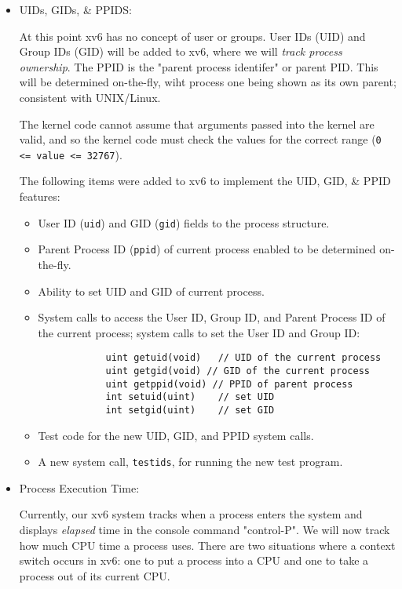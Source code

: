\documentclass[11pt,letterpaper]{report}
\begin{document}
	\begin{itemize}
		
	\item UIDs, GIDs, \& PPIDS:
	
	At this point xv6 has no concept of user or groups. User IDs (UID) and Group IDs (GID) will be added to xv6, where we will \emph{track process ownership}. The PPID is the "parent process identifer" or parent PID. This will be determined on-the-fly, wiht process one being shown as its own parent; consistent with UNIX/Linux.
	
	The kernel code cannot assume that arguments passed into the kernel are valid, and so the kernel code must check the values for the correct range ({\tt 0 <= value <= 32767}).
			
	The following items were added to xv6 to implement the UID, GID, \& PPID features:
			\begin{itemize}
	
			\item User ID ({\tt uid}) and GID ({\tt gid}) fields to the process structure.
	
			\item Parent Process ID ({\tt ppid}) of current process enabled to be determined on-the-fly.
	
			\item Ability to set UID and GID of current process.
	
			\item System calls to access the User ID, Group ID, and Parent Process ID of the current process; system calls to set the User ID and Group ID:
			\begin{verbatim}
			uint getuid(void)	// UID of the current process
			uint getgid(void) // GID of the current process
			uint getppid(void) // PPID of parent process
			int setuid(uint)	// set UID
			int setgid(uint)	// set GID
			\end{verbatim}

			\item Test code for the new UID, GID, and PPID system calls.
	
			\item A new system call, {\tt testids}, for running the new test program.

			\end{itemize}
	
	\item Process Execution Time:
	
	Currently, our xv6 system tracks when a process enters the system and displays \emph{elapsed} time in the console command "control-P". We will now track how much CPU time a process uses. There are two situations where a context switch occurs in xv6: one to put a process into a CPU and one to take a process out of its current CPU.
	

\end{itemize}
\end{document}
